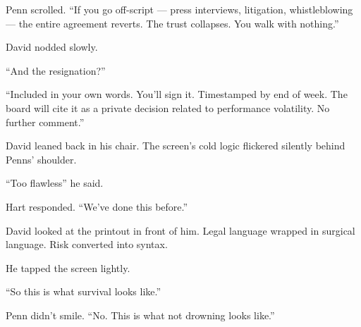 Penn scrolled. ``If you go off-script — press interviews, litigation, whistleblowing — the entire 
agreement reverts. The trust collapses. You walk with nothing.''

David nodded slowly.

``And the resignation?''

``Included in your own words. You’ll sign it. Timestamped by end of week. The board will cite it as a 
private decision related to performance volatility. No further comment.''

David leaned back in his chair. The screen’s cold logic flickered silently behind Penns’ shoulder. 

``Too flawless'' he said.

Hart responded.  
``We’ve done this before.''

David looked at the printout in front of him. Legal language wrapped in surgical language. Risk 
converted into syntax.

He tapped the screen lightly.

``So this is what survival looks like.''

Penn didn’t smile. ``No. This is what not drowning looks like.''

